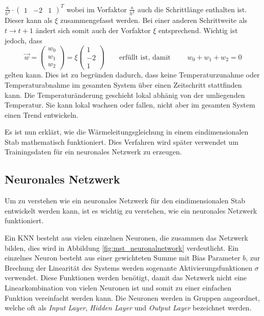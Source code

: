 $\frac{\kappa}{h^2} \cdot  \begin{pmatrix} 1 & -2 & 1 \end{pmatrix}^{T}$
wobei im Vorfaktor $\frac{\kappa}{h^2}$ auch die Schrittlänge
enthalten ist. Dieser kann als $\xi$ zusammengefasst werden. Bei
einer anderen Schrittweite als $t \rightarrow t+1$ ändert sich somit
auch der Vorfaktor $\xi$ entsprechend. Wichtig ist jedoch, dass
\begin{equation}
	\vec{w} = \begin{pmatrix} w_{0} \\ w_{1} \\ w_{2} \end{pmatrix} = \xi \begin{pmatrix} 1 \\ -2 \\ 1 \end{pmatrix}
	\qquad\text{erfüllt ist, damit }\qquad
	w_{0} + w_{1} + w_{2} = 0
\end{equation}
gelten kann. Dies ist zu begründen dadurch, dass keine Temperaturzunahme
oder Temperaturabnahme im gesamten System über einen Zeitschritt
stattfinden kann. Die Temperaturänderung geschieht lokal abhänig
von der umliegenden Temperatur. Sie kann lokal wachsen oder fallen,
nicht aber im gesamten System einen Trend entwickeln.

Es ist nun erklärt, wie die Wärmeleitungsgleichung in einem
eindimensionalen Stab mathematisch funktioniert. Dies Verfahren
wird später verwendet um Trainingsdaten für ein neuronales Netzwerk
zu erzeugen.

\subsection{Neuronales Netzwerk}
Um zu verstehen wie ein neuronales Netzwerk für den eindimensionalen
Stab entwickelt werden kann, ist es wichtig zu verstehen, wie ein
neuronales Netzwerk funktioniert.

Ein KNN besteht aus vielen einzelnen Neuronen, die zusammen das
Netzwerk bilden, dies wird in Abbildung \ref{fig:mst_neuronalnetwork}
verdeutlicht. Ein einzelnes Neuron besteht aus einer gewichteten
Summe mit Bias Parameter $b$, zur Brechung der Linearität des
Systems werden sogenante Aktivierungsfunktionen $\sigma$ verwendet.
Diese Funktionen werden benötigt, damit das Netzwerk nicht eine
Linearkombination von vielen Neuronen ist und somit zu einer
einfachen Funktion vereinfacht werden kann. Die Neuronen werden in
Gruppen angeordnet, welche oft als \textit{Input Layer}, \textit{Hidden
Layer} und \textit{Output Layer} bezeichnet werden.

